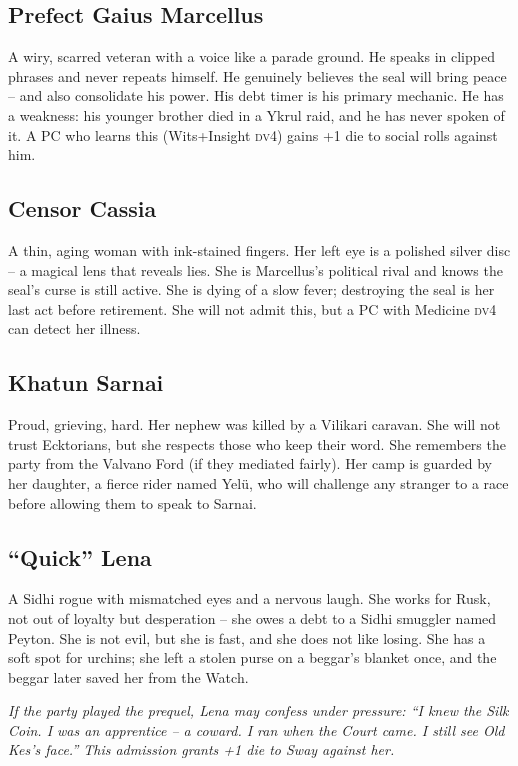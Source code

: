 \documentclass[10pt,twoside]{book}
\newcommand{\dv}{\textsc{dv}}
\begin{document}
\subsection{Prefect Gaius Marcellus}
A wiry, scarred veteran with a voice like a parade ground. He speaks in clipped phrases and never repeats himself. He genuinely believes the seal will bring peace -- and also consolidate his power. His debt timer is his primary mechanic. He has a weakness: his younger brother died in a Ykrul raid, and he has never spoken of it. A PC who learns this (Wits+Insight \dv 4) gains +1 die to social rolls against him.

\subsection{Censor Cassia}
A thin, aging woman with ink-stained fingers. Her left eye is a polished silver disc -- a magical lens that reveals lies. She is Marcellus's political rival and knows the seal's curse is still active. She is dying of a slow fever; destroying the seal is her last act before retirement. She will not admit this, but a PC with Medicine \dv 4 can detect her illness.

\subsection{Khatun Sarnai}
Proud, grieving, hard. Her nephew was killed by a Vilikari caravan. She will not trust Ecktorians, but she respects those who keep their word. She remembers the party from the Valvano Ford (if they mediated fairly). Her camp is guarded by her daughter, a fierce rider named Yelü, who will challenge any stranger to a race before allowing them to speak to Sarnai.

\subsection{``Quick'' Lena}
A Sidhi rogue with mismatched eyes and a nervous laugh. She works for Rusk, not out of loyalty but desperation -- she owes a debt to a Sidhi smuggler named Peyton. She is not evil, but she is fast, and she does not like losing. She has a soft spot for urchins; she left a stolen purse on a beggar's blanket once, and the beggar later saved her from the Watch.

\textit{If the party played the prequel, Lena may confess under pressure: ``I knew the Silk Coin. I was an apprentice -- a coward. I ran when the Court came. I still see Old Kes's face.'' This admission grants +1 die to Sway against her.}
\end{document}
